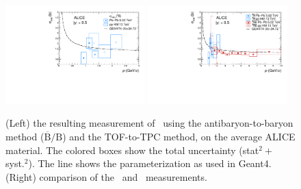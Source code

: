 \begin{figure}
    \centering
    \includegraphics[width=0.48\textwidth]{figures/FinalXS_antit_paper.pdf}%
    \includegraphics[width=0.48\textwidth]{figures/FinalXS_antitantiHe3_paper.pdf}%
    \caption{(Left) the resulting measurement of \sigmainelH\ using the antibaryon-to-baryon method ($\mathrm{\overline{B}}/\mathrm{B}$) and the TOF-to-TPC method, on the average ALICE material. The colored boxes show the total uncertainty (stat$^2 +$ syst.$^2$). The line shows the parameterization as used in Geant4. (Right) comparison of the \sigmainel\ and \sigmainelH\ measurements.}
    \label{fig:Results:tbar:xs}
\end{figure}


\newpage




